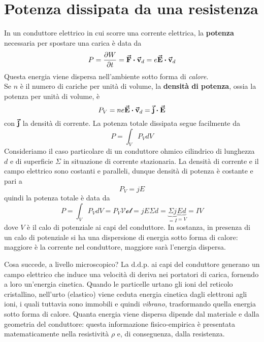 \section{Potenza dissipata da una resistenza}
In un conduttore elettrico in cui scorre una corrente elettrica, la \textbf{potenza} necessaria per spostare una carica è data da
\begin{equation}
	P=\pdv{W}{t}=\vba{F}\vdot \vba{v}_d=e\vba{E}\vdot\vba{v}_d
\end{equation}
Questa energia viene dispersa nell'ambiente sotto forma di \textit{calore}.\\
Se $n$ è il numero di cariche per unità di volume, la \textbf{densità di potenza}, ossia la potenza per unità di volume, è
\begin{equation}
	P_V=ne\vba{E}\vdot\vba{v}_d=\vba{j}\vdot \vba{E}
\end{equation}
con $\vb*{\va{j}}$ la densità di corrente. La potenza totale dissipata segue facilmente da
\begin{equation}
	P=\int_{V}P_VdV
\end{equation}
Consideriamo il caso particolare di un conduttore ohmico cilindrico di lunghezza $d$ e di superficie $\Sigma$ in situazione di corrente stazionaria. La densità di corrente e il campo elettrico sono costanti e paralleli, dunque densità di potenza è costante e pari a
\begin{equation}
	P_V=jE
\end{equation}
quindi la potenza totale è data da
\begin{equation*}
	P=\int_{V}P_VdV=P_V\mathcal{Vol}=jE\Sigma d=\underbrace{\Sigma j}_{=I}\underbrace{Ed}_{=V}=IV
\end{equation*}
dove $V$ è il calo di potenziale ai capi del conduttore. In sostanza, in presenza di un calo di potenziale si ha una dispersione di energia sotto forma di calore: maggiore è la corrente nel conduttore, maggiore sarà l'energia dispersa.

Cosa succede, a livello microscopico? La $\mathrm{d.d.p.}$ ai capi del conduttore generano un campo elettrico che induce una velocità di deriva nei portatori di carica, fornendo a loro un'energia cinetica. Quando le particelle urtano gli ioni del reticolo cristallino, nell'urto (elastico) viene ceduta energia cinetica dagli elettroni agli ioni, i quali tuttavia sono immobili e quindi \textit{vibrano}, trasformando quella energia sotto forma di calore. Quanta energia viene dispersa dipende dal materiale e dalla geometria del conduttore: questa informazione fisico-empirica è presentata matematicamente nella resistività $\rho$ e, di conseguenza, dalla resistenza.

